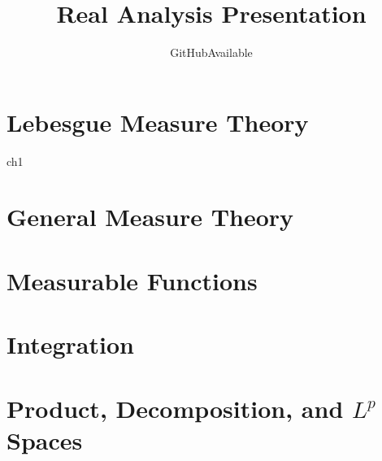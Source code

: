 \documentclass[openany]{book}
\title{Real Analysis Presentation}
\author{GitHubAvailable}
\begin{document}

\frontmatter  %

{
    \hypersetup{linkcolor=blue}
    \tableofcontents
}

\mainmatter  %

\chapter{Lebesgue Measure Theory}
{ch1}

\chapter{General Measure Theory}

\chapter{Measurable Functions}

\chapter{Integration}

\chapter{Product, Decomposition, and $L^p$ Spaces}
\end{document}
